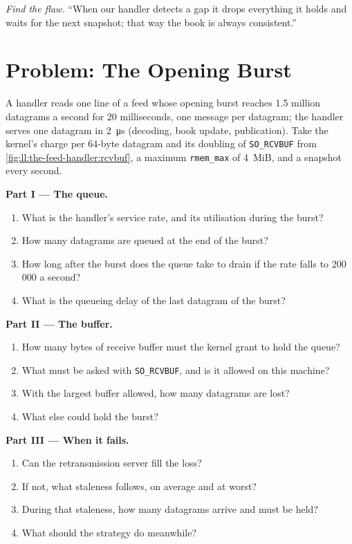 \begin{exercise}[$\star\star\star$]\label{exo:ll:the-feed-handler:8}
\emph{Find the flaw.} ``When our handler detects a gap it drops everything it holds and waits for the next snapshot; that way
the book is always consistent.''
\end{exercise}

\section{Problem: The Opening Burst}

\begin{problem}\label{pb:ll:the-feed-handler:1}
A handler reads one line of a feed whose opening burst reaches 1.5 million datagrams a second for 20 milliseconds, one
message per datagram; the handler serves one datagram in \qty{2}{\micro\second} (decoding, book update, publication). Take the
kernel's charge per 64-byte datagram and its doubling of \texttt{SO\_RCVBUF} from \cref{fig:ll:the-feed-handler:rcvbuf}, a
maximum \texttt{rmem\_max} of 4~MiB, and a snapshot every second.

\medskip\noindent\textbf{Part I --- The queue.}
\begin{enumerate}
\item What is the handler's service rate, and its utilisation during the burst?
\item How many datagrams are queued at the end of the burst?
\item How long after the burst does the queue take to drain if the rate falls to 200\,000 a second?
\item What is the queueing delay of the last datagram of the burst?
\end{enumerate}

\medskip\noindent\textbf{Part II --- The buffer.}
\begin{enumerate}[resume]
\item How many bytes of receive buffer must the kernel grant to hold the queue?
\item What must be asked with \texttt{SO\_RCVBUF}, and is it allowed on this machine?
\item With the largest buffer allowed, how many datagrams are lost?
\item What else could hold the burst?
\end{enumerate}

\medskip\noindent\textbf{Part III --- When it fails.}
\begin{enumerate}[resume]
\item Can the retransmission server fill the loss?
\item If not, what staleness follows, on average and at worst?
\item During that staleness, how many datagrams arrive and must be held?
\item What should the strategy do meanwhile?
\end{enumerate}


\end{problem}
